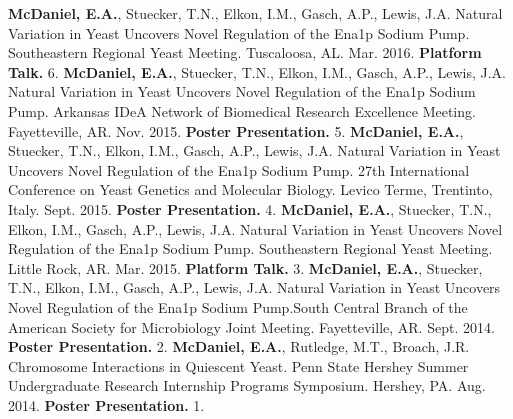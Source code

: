 


\begin{cvpubs}
    \cvpub
        {\textbf{McDaniel, E.A.}, Stuecker, T.N., Elkon, I.M., Gasch, A.P., Lewis, J.A. Natural Variation in Yeast Uncovers Novel Regulation of the Ena1p Sodium Pump. Southeastern Regional Yeast Meeting. Tuscaloosa, AL. Mar. 2016. \textbf{Platform Talk.}} %
        {6.} %
        \cvpub
        {\textbf{McDaniel, E.A.}, Stuecker, T.N., Elkon, I.M., Gasch, A.P., Lewis, J.A. Natural Variation in Yeast Uncovers Novel Regulation of the Ena1p Sodium Pump. Arkansas IDeA Network of Biomedical Research Excellence Meeting. Fayetteville, AR. Nov. 2015. \textbf{Poster Presentation.}}       
        {5.}
    \cvpub
        {\textbf{McDaniel, E.A.}, Stuecker, T.N., Elkon, I.M., Gasch, A.P., Lewis, J.A. Natural Variation in Yeast Uncovers Novel Regulation of the Ena1p Sodium Pump. 27th International Conference on Yeast Genetics and Molecular Biology. Levico Terme, Trentinto, Italy. Sept. 2015. \textbf{Poster Presentation.}}
        {4.}
        \cvpub
        {\textbf{McDaniel, E.A.}, Stuecker, T.N., Elkon, I.M., Gasch, A.P., Lewis, J.A. Natural Variation in Yeast Uncovers Novel Regulation of the Ena1p Sodium Pump. Southeastern Regional Yeast Meeting. Little Rock, AR. Mar. 2015. \textbf{Platform Talk.}}
        {3.}
    \cvpub
        {\textbf{McDaniel, E.A.}, Stuecker, T.N., Elkon, I.M., Gasch, A.P., Lewis, J.A. Natural Variation in Yeast Uncovers Novel Regulation of the Ena1p Sodium Pump.South Central Branch of the American Society for Microbiology Joint Meeting. Fayetteville, AR. Sept. 2014. \textbf{Poster Presentation.}}
        {2.}
    \cvpub
        {\textbf{McDaniel, E.A.}, Rutledge, M.T., Broach, J.R. Chromosome Interactions in Quiescent Yeast. Penn State Hershey Summer Undergraduate Research Internship Programs Symposium. Hershey, PA. Aug. 2014. \textbf{Poster Presentation.}}
        {1.}
\end{cvpubs}
